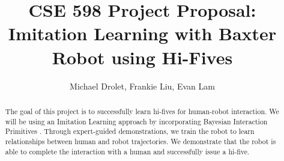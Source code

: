 \documentclass[letterpaper, 10 pt, conference]{ieeeconf}  %
\title{\LARGE \bf
CSE 598 Project Proposal: \\
Imitation Learning with Baxter Robot using Hi-Fives
}
\author{Michael Drolet, Frankie Liu, Evan Lam}
\begin{document}
\maketitle
\thispagestyle{empty}
\pagestyle{empty}


\begin{abstract}
The goal of this project is to successfully learn hi-fives for human-robot interaction. We will be using an Imitation Learning approach by incorporating Bayesian Interaction Primitives \cite{c1}. Through expert-guided demonstrations, we train the robot to learn relationships between human and robot trajectories. We demonstrate that the robot is able to complete the interaction with a human and successfully issue a hi-five.
\end{abstract}


\end{document}
